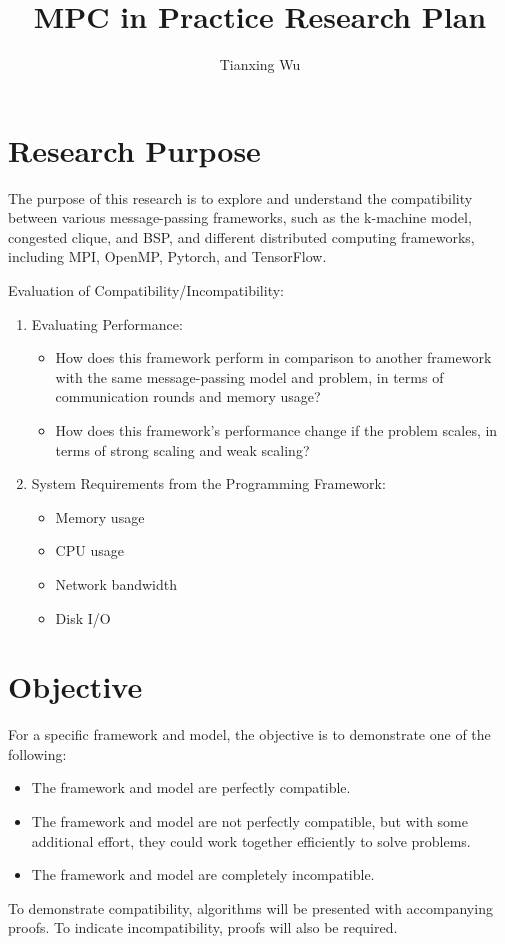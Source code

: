 \documentclass{article}
\title{MPC in Practice Research Plan}
\author{Tianxing Wu}
\begin{document}
\maketitle

\section{Research Purpose}
The purpose of this research is to explore and understand the compatibility between various message-passing frameworks, such as the k-machine model, congested clique, and BSP, and different distributed computing frameworks, including MPI, OpenMP, Pytorch, and TensorFlow.

Evaluation of Compatibility/Incompatibility:
\begin{enumerate}
  \item{
    Evaluating Performance:
      \begin{itemize}
        \item How does this framework perform in comparison to another framework with the same message-passing model and problem, in terms of communication rounds and memory usage?
        \item How does this framework's performance change if the problem scales, in terms of strong scaling and weak scaling?
      \end{itemize}
    }
  \item {
    System Requirements from the Programming Framework:
      \begin{itemize}
        \item Memory usage
        \item CPU usage
        \item Network bandwidth
        \item Disk I/O
      \end{itemize}
    }
\end{enumerate}

\section{Objective}
For a specific framework and model, the objective is to demonstrate one of the following:
\begin{itemize}
  \item The framework and model are perfectly compatible.
  \item The framework and model are not perfectly compatible, but with some additional effort, they could work together efficiently to solve problems.
  \item The framework and model are completely incompatible.
\end{itemize}
To demonstrate compatibility, algorithms will be presented with accompanying proofs. To indicate incompatibility, proofs will also be required.
\end{document}
